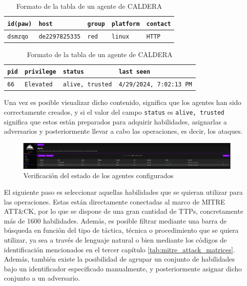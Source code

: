 \begin{table}[H]
\centering
\footnotesize
\label{tab:caldera-agent}
\begin{tabularx}{\textwidth}{|X|X|X|X|X|} 
\hline
\texttt{id(paw)} & \texttt{host} & \texttt{group} & \texttt{platform} & \texttt{contact} \\
\hline
\texttt{dsmzqo} & \texttt{de2297825335} & \texttt{red} & \texttt{linux} & \texttt{HTTP} \\
\hline 
\end{tabularx}

\vspace{2mm}

\begin{tabularx}{\textwidth}{|X|X|X|X|}
\hline
\texttt{pid} & \texttt{privilege} & \texttt{status} & \texttt{last seen}  \\
\hline
\texttt{66} & \texttt{Elevated} & \texttt{alive, trusted} & \texttt{4/29/2024, 7:02:13 PM}\\
\hline 
\end{tabularx}
\caption{Formato de la tabla de un agente de CALDERA}
\end{table}

Una vez es posible visualizar dicho contenido, significa que los agentes han sido correctamente creados, y si el valor del campo \texttt{status} es \texttt{alive, trusted} significa que estos están preparados para adquirir habilidades, asignarlas a adversarios y posteriormente llevar a cabo las operaciones, es decir, los ataques.

\begin{figure}[H]
    \centering
    \includegraphics[width=1\linewidth]{imagenes/prepared-agents.png}
    \caption{Verificación del estado de los agentes configurados}
    \label{fig:prepared-agents}
\end{figure}

El siguiente paso es seleccionar aquellas habilidades que se quieran utilizar para las operaciones. Estas están directamente conectadas al marco de MITRE \gls{ATT&CK}, por lo que se dispone de una gran cantidad de \gls{TTP}s, concretamente más de 1600 habilidades. Además, es posible filtrar mediante una barra de búsqueda en función del tipo de táctica, técnica o procedimiento que se quiera utilizar, ya sea a través de lenguaje natural o bien mediante los códigos de identificación mencionados en el tercer capítulo \ref{tab:mitre_attack_matrices}. Además, también existe la posibilidad de agrupar un conjunto de habilidades bajo un identificador especificado manualmente, y posteriormente asignar dicho conjunto a un adversario.

